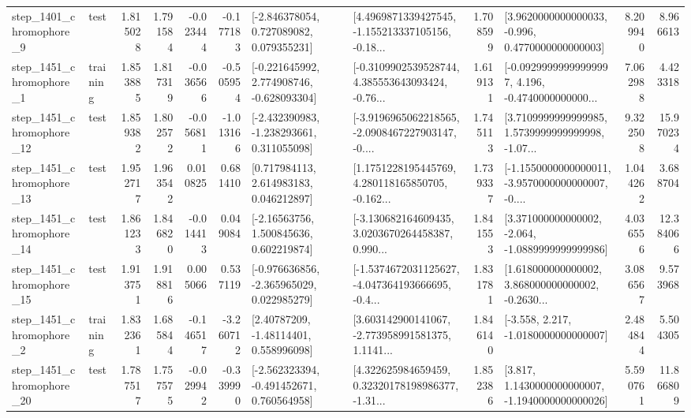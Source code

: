 \begin{tabular}{llrrrrllrlrr}
  step\_1401\_chromophore\_9 &      test &      1.815028 &    1.791584 &     -0.023444 & -0.177183 &    [-2.846378054, 0.727089082, 0.079355231] &  [4.4969871339427545, -1.155213337105156, -0.18... &       1.708599 &   [3.9620000000000033, -0.996, 0.4770000000000003] &            8.209940 &          8.966613 \\
  step\_1451\_chromophore\_1 &  training &      1.853885 &    1.817319 &     -0.036566 & -0.505954 &   [-0.221645992, 2.774908746, -0.628093304] &  [-0.3109902539528744, 4.385553643093424, -0.76... &       1.619131 &  [-0.09299999999999997, 4.196, -0.4740000000000... &            7.062988 &          4.423318 \\
 step\_1451\_chromophore\_12 &      test &      1.859382 &    1.802572 &     -0.056811 & -1.013166 &   [-2.432390983, -1.238293661, 0.311055098] &  [-3.9196965062218565, -2.0908467227903147, -0.... &       1.745113 &  [3.7109999999999985, 1.5739999999999998, -1.07... &            9.322508 &         15.970234 \\
 step\_1451\_chromophore\_13 &      test &      1.952717 &    1.963542 &      0.010825 &  0.681410 &     [0.717984113, 2.614983183, 0.046212897] &  [1.1751228195445769, 4.280118165850705, -0.162... &       1.739337 &  [-1.1550000000000011, -3.9570000000000007, -0.... &            1.044262 &          3.688704 \\
 step\_1451\_chromophore\_14 &      test &      1.861233 &    1.846820 &     -0.014413 &  0.049084 &     [-2.16563756, 1.500845636, 0.602219874] &  [-3.130682164609435, 3.0203670264458387, 0.990... &       1.841553 &   [3.371000000000002, -2.064, -1.0889999999999986] &            4.036556 &         12.384066 \\
 step\_1451\_chromophore\_15 &      test &      1.913751 &    1.918816 &      0.005066 &  0.537119 &   [-0.976636856, -2.365965029, 0.022985279] &  [-1.5374672031125627, -4.047364193666695, -0.4... &       1.831781 &  [1.618000000000002, 3.868000000000002, -0.2630... &            3.086567 &          9.573968 \\
  step\_1451\_chromophore\_2 &  training &      1.832361 &    1.685844 &     -0.146517 & -3.260712 &      [2.40787209, -1.48114401, 0.558996098] &  [3.603142900141067, -2.773958991581375, 1.1141... &       1.846140 &               [-3.558, 2.217, -1.0180000000000007] &            2.484844 &          5.504305 \\
 step\_1451\_chromophore\_20 &      test &      1.787517 &    1.757575 &     -0.029942 & -0.339990 &   [-2.562323394, -0.491452671, 0.760564958] &  [4.322625984659459, 0.32320178198986377, -1.31... &       1.852386 &   [3.817, 1.1430000000000007, -1.1940000000000026] &            5.590761 &         11.866809 \\

\end{tabular}
